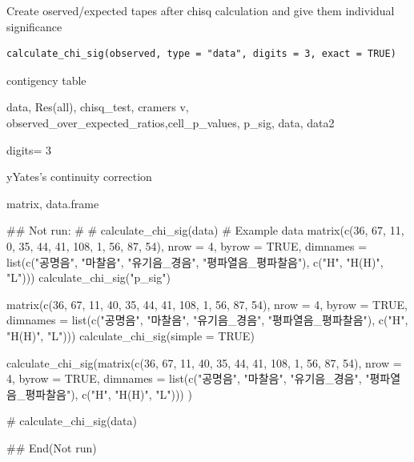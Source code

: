 \documentclass[a4paper]{book}
\begin{document}
%
\begin{Description}
Create oserved/expected tapes after chisq calculation and give them individual significance
\end{Description}
%
\begin{Usage}
\begin{verbatim}
calculate_chi_sig(observed, type = "data", digits = 3, exact = TRUE)
\end{verbatim}
\end{Usage}
%
\begin{Arguments}
\begin{ldescription}
\item[\code{observed}] contigency table

\item[\code{type}] data, Res(all), chisq\_test, cramers v, observed\_over\_expected\_ratios,cell\_p\_values, p\_sig, data, data2

\item[\code{digits}] digits= 3

\item[\code{exact}] yYates's continuity correction
\end{ldescription}
\end{Arguments}
%
\begin{Value}
matrix, data.frame
\end{Value}
%
\begin{Examples}
\begin{ExampleCode}

## Not run: 
# # calculate_chi_sig(data)
# Example data
matrix(c(36, 67, 11,
          0, 35, 44,
         41, 108, 1,
          56, 87, 54),
           nrow = 4, byrow = TRUE,
   dimnames = list(c("공명음", "마찰음",
     "유기음_경음", "평파열음_평파찰음"),  c("H", "H(H)", "L"))) %
     calculate_chi_sig("p_sig")


     matrix(c(36, 67, 11,
              40, 35, 44,
              41, 108, 1,
              56, 87, 54), nrow = 4, byrow = TRUE,
                     dimnames = list(c("공명음", "마찰음",
                                    "유기음_경음", "평파열음_평파찰음"),
                                 c("H", "H(H)", "L"))) %
                calculate_chi_sig(simple = TRUE)



  calculate_chi_sig(matrix(c(36, 67, 11,
                      40, 35, 44,
                   41, 108, 1,
              56, 87, 54), nrow = 4, byrow = TRUE,
               dimnames = list(c("공명음", "마찰음",
              "유기음_경음", "평파열음_평파찰음"),
              c("H", "H(H)", "L")))   )


 # calculate_chi_sig(data)

## End(Not run)

\end{ExampleCode}
\end{Examples}
\end{document}
